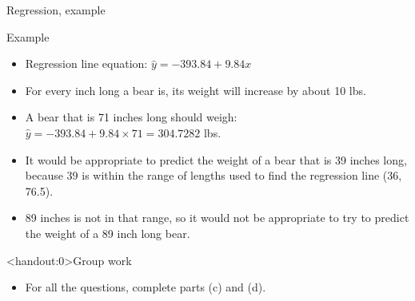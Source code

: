 \documentclass[xcolor=table]{beamer}
\begin{document}
\begin{frame}{Regression, example}
\begin{exampleblock}{Example}
\large
\begin{itemize}
\item Regression line equation: $\hat y = -393.84 + 9.84 x$
\pause\item For every inch long a bear is, its weight will increase by about 10 lbs.
\pause\item A bear that is 71 inches long should weigh:  $\hat y = -393.84 + 9.84 \times 71= 304.7282$ lbs.
\pause\item It would be appropriate to predict the weight of a bear that is 39 inches long, because 39 is within the range of lengths used to find the regression line (36, 76.5).
\pause\item 89 inches is not in that range, so it would not be appropriate to try to predict the weight of a 89 inch long bear.
\end{itemize}
\end{exampleblock}

\end{frame}

\begin{frame}<handout:0>{Group work}
\begin{block}{}
\large
\begin{itemize}
\item For all the questions, complete parts (c) and (d).
\end{itemize}
\end{block}
\end{frame}
\end{document}
